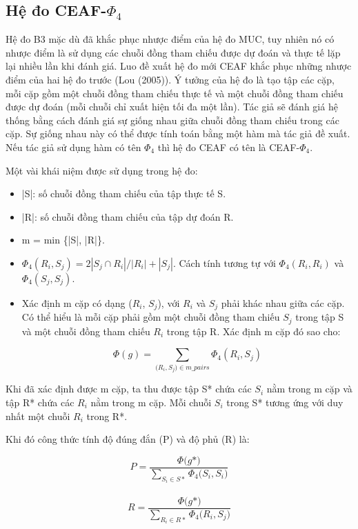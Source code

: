 \documentclass[12pt]{report}
\begin{document}
					\subsection*{Hệ đo CEAF-$\Phi_4$}
					\par Hệ đo B3 mặc dù đã khắc phục nhược điểm của hệ đo MUC, tuy nhiên nó có nhược điểm là sử dụng các chuỗi đồng tham chiếu được dự đoán và thực tế lặp lại nhiều lần khi đánh giá. Luo đề xuất hệ đo mới CEAF khắc phục những nhược điểm của hai hệ đo trước (Lou (2005)\cite{lou05}). Ý tưởng của hệ đo là tạo tập các cặp, mỗi cặp gồm một chuỗi đồng tham chiếu thực tế và một chuỗi đồng tham chiếu được dự đoán (mỗi chuỗi chỉ xuất hiện tối đa một lần). Tác giả sẽ đánh giá hệ thống bằng cách đánh giá sự giống nhau giữa chuỗi đồng tham chiếu trong các cặp. Sự giống nhau này có thể được tính toán bằng một hàm mà tác giả đề xuất. Nếu tác giả sử dụng hàm có tên $\Phi_4$ thì hệ đo CEAF có tên là CEAF-$\Phi_4$.
					\par Một vài khái niệm được sử dụng trong hệ đo:
					\begin{itemize}
					\item{|S|: số chuỗi đồng tham chiếu của tập thực tế S.}
					\item{|R|: số chuỗi đồng tham chiếu của tập dự đoán R.}
					\item{m = min \{|S|, |R|\}.}
					\item{$\Phi_4(R_i,S_j) = 2 |S_j \cap R_i|/ |R_i| + |S_j|$. Cách tính tương tự với $\Phi_4(R_i,R_i)$ và $\Phi_4(S_j,S_j)$.}  
					\item{Xác định m cặp có dạng ($R_i$, $S_j$), với $R_i$ và $S_j$ phải khác nhau giữa các cặp. Có thể hiểu là mỗi cặp phải gồm một chuỗi đồng tham chiếu $S_j$ trong tập S và một chuỗi đồng tham chiếu $R_i$ trong tập R. Xác định m cặp đó sao cho: 
					\begin{center}
						\begin{equation*}
							\Phi(g) = \sum_{\big(R_i,S_j) \in m\_pairs} \Phi_4(R_i,S_j)
						\end{equation*}
					\end{center}}
				\end{itemize}
				\par Khi đã xác định được m cặp, ta thu được tập S* chứa các $S_i$ nằm trong m cặp và tập R* chứa các $R_i$ nằm trong m cặp. Mỗi chuỗi $S_i$ trong S* tương ứng với duy nhất một chuỗi $R_i$ trong R*.
				\par Khi đó công thức tính độ đúng đắn (P) và độ phủ (R) là:						
					\begin{center}
						\begin{equation*}
							P = \frac{\Phi \big(g*)}{\sum_{S_i \in S*}\Phi_4 \big(S_i, S_i)}
						\end{equation*}
						\\
						\begin{equation*}
							R = \frac{\Phi \big(g*)}{\sum_{R_i \in R*}\Phi_4 \big(R_i, S_j)}
						\end{equation*}					
					\end{center}
\end{document}

